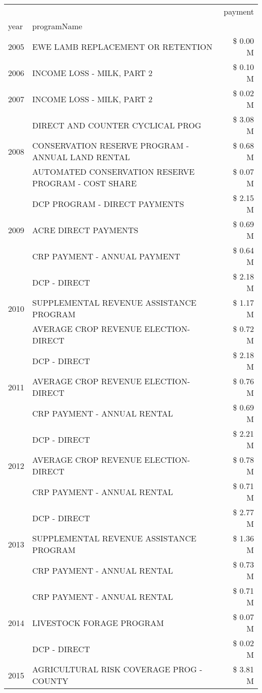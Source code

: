 \begin{tabular}{llr}
\toprule
 &  & payment \\
year & programName &  \\
\midrule
2005 & EWE LAMB REPLACEMENT OR RETENTION & \$ 0.00 M \\
\cline{1-3}
2006 & INCOME LOSS - MILK, PART 2 & \$ 0.10 M \\
\cline{1-3}
2007 & INCOME LOSS - MILK, PART 2 & \$ 0.02 M \\
\cline{1-3}
\multirow[t]{3}{*}{2008} & DIRECT AND COUNTER CYCLICAL PROG & \$ 3.08 M \\
 & CONSERVATION RESERVE PROGRAM - ANNUAL LAND RENTAL & \$ 0.68 M \\
 & AUTOMATED CONSERVATION RESERVE PROGRAM - COST SHARE & \$ 0.07 M \\
\cline{1-3}
\multirow[t]{3}{*}{2009} & DCP PROGRAM - DIRECT PAYMENTS & \$ 2.15 M \\
 & ACRE DIRECT PAYMENTS & \$ 0.69 M \\
 & CRP PAYMENT - ANNUAL PAYMENT & \$ 0.64 M \\
\cline{1-3}
\multirow[t]{3}{*}{2010} & DCP - DIRECT & \$ 2.18 M \\
 & SUPPLEMENTAL REVENUE ASSISTANCE PROGRAM & \$ 1.17 M \\
 & AVERAGE CROP REVENUE ELECTION-DIRECT & \$ 0.72 M \\
\cline{1-3}
\multirow[t]{3}{*}{2011} & DCP - DIRECT & \$ 2.18 M \\
 & AVERAGE CROP REVENUE ELECTION-DIRECT & \$ 0.76 M \\
 & CRP PAYMENT - ANNUAL RENTAL & \$ 0.69 M \\
\cline{1-3}
\multirow[t]{3}{*}{2012} & DCP - DIRECT & \$ 2.21 M \\
 & AVERAGE CROP REVENUE ELECTION-DIRECT & \$ 0.78 M \\
 & CRP PAYMENT - ANNUAL RENTAL & \$ 0.71 M \\
\cline{1-3}
\multirow[t]{3}{*}{2013} & DCP - DIRECT & \$ 2.77 M \\
 & SUPPLEMENTAL REVENUE ASSISTANCE PROGRAM & \$ 1.36 M \\
 & CRP PAYMENT - ANNUAL RENTAL & \$ 0.73 M \\
\cline{1-3}
\multirow[t]{3}{*}{2014} & CRP PAYMENT - ANNUAL RENTAL & \$ 0.71 M \\
 & LIVESTOCK FORAGE PROGRAM & \$ 0.07 M \\
 & DCP - DIRECT & \$ 0.02 M \\
\cline{1-3}
\multirow[t]{3}{*}{2015} & AGRICULTURAL RISK COVERAGE PROG - COUNTY & \$ 3.81 M \\

\end{tabular}
